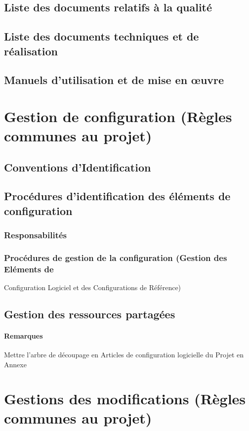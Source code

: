 \documentclass[a4paper]{article}
\begin{document}
\subsection{Liste des documents relatifs à la qualité}
\subsection{Liste des documents techniques et de réalisation}
\subsection{Manuels d'utilisation et de mise en œuvre}

\section{Gestion de configuration (Règles communes au projet)}
\subsection{Conventions d'Identification}
\subsection{Procédures d'identification des éléments de configuration }
\subsubsection{Responsabilités}
\subsubsection{Procédures de gestion de la configuration (Gestion des Eléments de }
Configuration Logiciel et des Configurations de Référence)
\subsection{Gestion des ressources partagées}

\paragraph{Remarques} Mettre l'arbre de découpage en Articles de configuration logicielle du Projet en Annexe

\section{Gestions des modifications (Règles communes au projet)}
\end{document}
